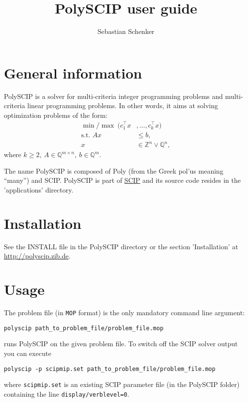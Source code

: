\documentclass[11pt,listof=totoc]{scrartcl}
\title{PolySCIP user guide}
\author{Sebastian Schenker}
\date{}
\theoremstyle{definition}
\begin{document}
\maketitle
\tableofcontents

\section{General information}
PolySCIP is a solver for multi-criteria integer programming problems
and multi-criteria linear programming problems. In other words, it
aims at solving optimization problems of the form:
\begin{align*}
\min / \max~ (c_1^\top x&, \ldots, c_k^\top x) \\
\mbox{s.t. } Ax &\leq b,\\
x &\in \mathbb{Z}^n \lor \mathbb{Q}^n,
\end{align*}
where $k \geq 2,~ A \in \mathbb{Q}^{m \times n},~ b \in
\mathbb{Q}^m$.

The name PolySCIP is composed of Poly (from the Greek
\textgreek{pol'us} meaning ``many'') and SCIP. PolySCIP is part of \href{http://scip.zib.de}{SCIP} and its source code resides in the 'applications' directory.

\section{Installation}

See the INSTALL file in the PolySCIP directory or the section 'Installation' at \url{http://polyscip.zib.de}.

\section{Usage}

The problem file (in \texttt{MOP} format) is the only mandatory command line argument:
\begin{verbatim}
polyscip path_to_problem_file/problem_file.mop
\end{verbatim} runs PolySCIP on the given problem file. To switch off the SCIP solver output you can execute 
\begin{verbatim}
polyscip -p scipmip.set path_to_problem_file/problem_file.mop
\end{verbatim} where \texttt{scipmip.set} is an existing SCIP parameter file (in the PolySCIP folder) containing the line \texttt{display/verblevel=0}. 
\end{document}
